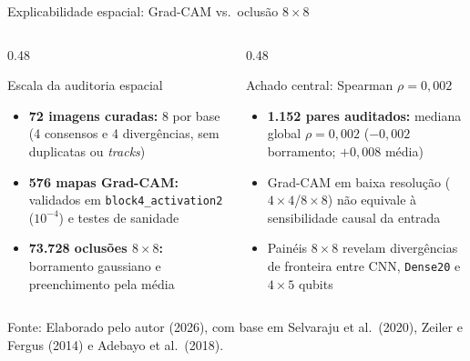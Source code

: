 \documentclass[aspectratio=169,11pt,brazil]{beamer}
\newcommand{\fonte}[1]{\par\vfill{\footnotesize\color{textmuted}Fonte: #1\par}}
\begin{document}
\begin{frame}{Explicabilidade espacial: Grad-CAM vs.\ oclusão $8\times 8$}
  \begin{columns}[T,onlytextwidth]
    \begin{column}{0.48\textwidth}
      \begin{block}{Escala da auditoria espacial}
        \begin{itemize}\setlength{\itemsep}{2pt}
          \item \textbf{72 imagens curadas:} 8 por base (4 consensos e 4 divergências, sem duplicatas ou \textit{tracks})
          \item \textbf{576 mapas Grad-CAM:} validados em \texttt{block4\_activation2} ($10^{-4}$) e testes de sanidade
          \item \textbf{73.728 oclusões $8\times 8$:} borramento gaussiano e preenchimento pela média
        \end{itemize}
      \end{block}
    \end{column}
    \begin{column}{0.48\textwidth}
      \begin{alertblock}{Achado central: Spearman $\rho = 0{,}002$}
        \begin{itemize}\setlength{\itemsep}{2pt}
          \item \textcolor{badred}{\textbf{1.152 pares auditados:}} mediana global $\rho = 0{,}002$ ($-0{,}002$ borramento; $+0{,}008$ média)
          \item Grad-CAM em baixa resolução ($4\times 4$/$8\times 8$) não equivale à sensibilidade causal da entrada
          \item Painéis $8\times 8$ revelam divergências de fronteira entre CNN, \texttt{Dense20} e $4\times 5$ qubits
        \end{itemize}
      \end{alertblock}
    \end{column}
  \end{columns}
  \fonte{Elaborado pelo autor (2026), com base em Selvaraju et al.\ (2020), Zeiler e Fergus (2014) e Adebayo et al.\ (2018).}
\end{frame}
\end{document}
